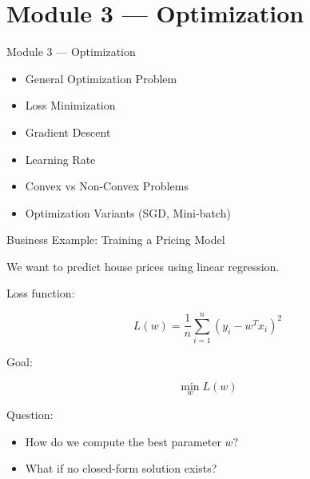 \documentclass{beamer}
\begin{document}
\section{Module 3 — Optimization}

\begin{frame}{Module 3 — Optimization}
\begin{itemize}
    \item General Optimization Problem
    \item Loss Minimization
    \item Gradient Descent
    \item Learning Rate
    \item Convex vs Non-Convex Problems
    \item Optimization Variants (SGD, Mini-batch)
\end{itemize}
\end{frame}

\begin{frame}{Business Example: Training a Pricing Model}

We want to predict house prices using linear regression.

\vspace{0.3cm}

Loss function:

\[
L(w) = \frac{1}{n} \sum_{i=1}^n (y_i - w^T x_i)^2
\]

\vspace{0.3cm}

Goal:

\[
\min_w L(w)
\]

\vspace{0.5cm}

Question:
\begin{itemize}
    \item How do we compute the best parameter $w$?
    \item What if no closed-form solution exists?
\end{itemize}

\end{frame}
\end{document}
